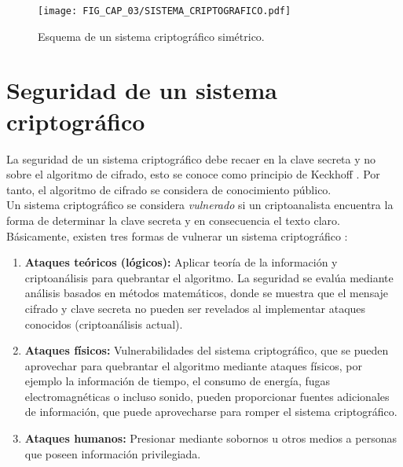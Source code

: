 \begin{figure}[!htbp] %
	\center
	 \texttt{[image: FIG\_CAP\_03/SISTEMA\_CRIPTOGRAFICO.pdf]}    
	\caption{Esquema de un sistema criptográfico simétrico.}
\end{figure}

\section{Seguridad de un sistema criptográfico}
La seguridad de un sistema criptográfico debe recaer en la clave secreta y no sobre el algoritmo de cifrado, esto se conoce como principio de Keckhoff \cite{P_2011}. Por tanto, el algoritmo de cifrado se considera de conocimiento público. \\

Un sistema criptográfico se considera \textit{vulnerado} si un criptoanalista encuentra la forma de determinar la clave secreta y en consecuencia el texto claro. Básicamente, existen tres formas de vulnerar un sistema criptográfico \cite{AyL_2006}: 
\begin{enumerate}
\item \textbf{Ataques teóricos (lógicos):} Aplicar teoría de la información y criptoanálisis para quebrantar el algoritmo. La seguridad se evalúa mediante análisis basados en métodos matemáticos, donde se muestra que el mensaje cifrado y clave secreta no pueden ser revelados al implementar ataques conocidos (criptoanálisis actual).
\item \textbf{Ataques físicos:} Vulnerabilidades del sistema criptográfico, que se pueden aprovechar para quebrantar el algoritmo mediante ataques físicos, por ejemplo la información de tiempo, el consumo de energía, fugas electromagnéticas o incluso sonido, pueden proporcionar fuentes adicionales de información, que puede aprovecharse para romper el sistema criptográfico.
\item \textbf{Ataques humanos:} Presionar mediante sobornos u otros medios a personas que poseen información privilegiada. \\
\end{enumerate}

